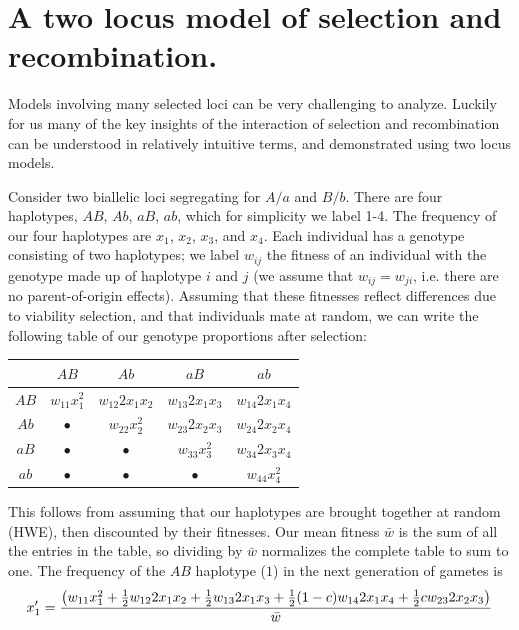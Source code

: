 \section{A two locus model of selection and recombination.}
Models involving many selected loci can be very challenging to analyze. Luckily for us many of the key insights of the interaction of selection and recombination can be understood in relatively intuitive terms, and demonstrated using two locus models. 

Consider two biallelic loci segregating for $A/a$ and $B/b$. There are four haplotypes, $AB$, $Ab$, $aB$, $ab$, which for simplicity we label 1-4. The frequency of our four haplotypes are $x_1$, $x_2$, $x_3$, and $x_4$. Each individual has a genotype consisting of two haplotypes; we label $w_{ij}$ the fitness of an individual with the genotype made up of haplotype $i$ and $j$ (we assume that $w_{ij}=w_{ji}$, i.e. there are no parent-of-origin effects). Assuming that these fitnesses reflect differences due to viability selection, and that individuals mate at random, we can write the following table of our genotype proportions after selection:\\
\begin{center}
\begin{tabular}{c|cccc}
         & $AB$			& $Ab$				& $aB$				& $ab$\\
\hline
$AB$ & $w_{11} x_1^2$ 	& $w_{12} 2 x_1 x_2$  	& $w_{13} 2 x_1 x_3$ 	& $w_{14} 2 x_1 x_4$ \\
$Ab$ & $\bullet$ 	  	& $w_{22} x_2^2$ 	  	& $w_{23} 2 x_2 x_3$  	& $w_{24} 2 x_2 x_4$ \\  
$aB$ & $\bullet$ 		& $\bullet$ 			& $w_{33} x_3^2$ 	  	& $w_{34} 2 x_3 x_4$ \\  
$ab$ & $\bullet$ 		& $\bullet$			& $\bullet$ 			&  $w_{44} x_4^2$ \\
\end{tabular}
\end{center}
This follows from assuming that our haplotypes are brought together at random (HWE), then discounted by their fitnesses. Our mean fitness $\bar{w}$ is the sum of all the entries in the table, so dividing by $\bar{w}$ normalizes the complete table to sum to one. The frequency of the $AB$ haplotype ($1$) in the next generation of gametes is
\begin{equation}
x_1' = \frac{\big( w_{11} x_1^2 +	 \tfrac{1}{2} w_{12} 2 x_1 x_2  + \tfrac{1}{2} w_{13} 2x_1 x_3  +	 \tfrac{1}{2} (1-c) w_{14} 2 x_1 x_4 + \tfrac{1}{2} c w_{23} 2 x_2 x_3   \big)}{ \bar{w} } \label{eqn:hapfreq}
\end{equation}
